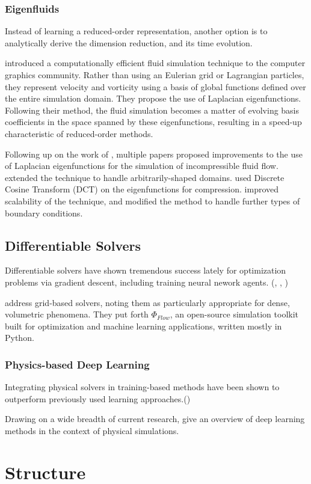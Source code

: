 \subsubsection*{Eigenfluids}
Instead of learning a reduced-order representation, another option is to
analytically derive the dimension reduction, and its time evolution.

\cite{dewitt} introduced a computationally efficient fluid simulation technique
to the computer graphics community. Rather than using an Eulerian grid or
Lagrangian particles, they represent velocity and vorticity using a basis of
global functions defined over the entire simulation domain. They propose the use
of Laplacian eigenfunctions. Following their method, the fluid simulation
becomes a matter of evolving basis coefficients in the space spanned by
these eigenfunctions, resulting in a speed-up characteristic of reduced-order
methods.

Following up on the work of \cite{dewitt}, multiple papers proposed improvements
to the use of Laplacian eigenfunctions for the simulation of incompressible
fluid flow. \cite{ModelReductionFluidSim} extended the technique to handle
arbitrarily-shaped domains. \cite{EigenfluidCompression} used Discrete Cosine
Transform (DCT) on the eigenfunctions for compression.
\cite{scalable-eigenfluids} improved scalability of the technique, and modified
the method to handle further types of boundary conditions.

\subsection{Differentiable Solvers}
Differentiable solvers have shown tremendous success lately for optimization
problems via gradient descent, including training neural nework agents.
(\cite{holl2019pdecontrol}, \cite{difftaichi}, \cite{warp2022})


\cite{holl2019pdecontrol} address grid-based solvers, noting them as
particularly appropriate for dense, volumetric phenomena. They put forth
$\Phi_{Flow}$, an open-source simulation toolkit built for optimization and
machine learning applications, written mostly in Python.

\subsubsection*{Physics-based Deep Learning}
Integrating physical solvers in training-based methods have been shown to
outperform previously used learning approaches.(\cite{solver-in-the-loop})

Drawing on a wide breadth of current research, \cite{pbdl} give an overview of
deep learning methods in the context of physical simulations. 


\section{Structure}

